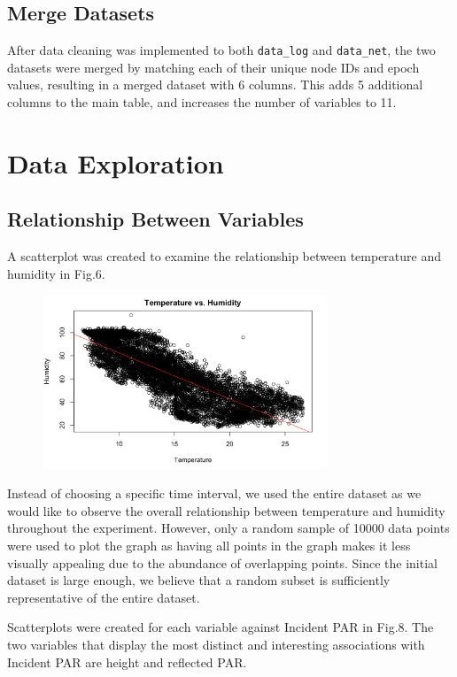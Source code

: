 \documentclass[twocolumn,11pt]{asme2ej}
\begin{document}
\subsection{Merge Datasets}

After data cleaning was implemented to both \texttt{data\_log} and \texttt{data\_net}, the two datasets were merged by matching each of their unique node IDs and epoch values, resulting in a merged dataset with 6 columns. This adds 5 additional columns to the main table, and increases the number of variables to 11.

\section{Data Exploration}
\subsection{Relationship Between Variables}

A scatterplot was created to examine the relationship between temperature and humidity in Fig.6.

\begin{figure}
    \centering
    \includegraphics[width=85mm]{3a.png} 
    \caption{}
    \label{fig:3a}
\end{figure}

Instead of choosing a specific time interval, we used the entire dataset as we would like to observe the overall relationship between temperature and humidity throughout the experiment. However, only a random sample of 10000 data points were used to plot the graph as having all points in the graph makes it less visually appealing due to the abundance of overlapping points. Since the initial dataset is large enough, we believe that a random subset is sufficiently representative of the entire dataset.

Scatterplots were created for each variable against Incident PAR in Fig.8. The two variables that display the most distinct and interesting associations with Incident PAR are height and reflected PAR. 
\end{document}
